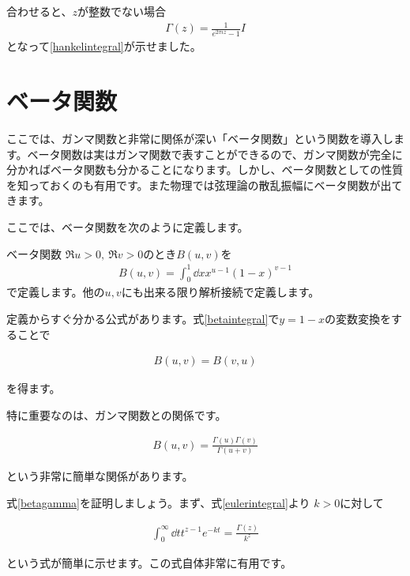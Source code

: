 \documentclass[report,paper=a4, fontsize=12pt, line_length=16cm, number_of_lines=33,dvipdfmx]{jlreq}
\newenvironment{important}{\begin{tcolorbox}[
  colback = white,
  colframe = red!35,
  boxrule = 2mm,
  fonttitle = \bfseries,
  after = \noindent] }{\end{tcolorbox}}
\numberwithin{equation}{section}
\begin{document}
合わせると、$z$が整数でない場合
\begin{align}
 \Gamma(z)=\frac{1}{e^{2\pi iz}-1} I
\end{align}
となって\eqref{hankelintegral}が示せました。


\section{ベータ関数}
ここでは、ガンマ関数と非常に関係が深い「ベータ関数」という関数を導入します。ベータ関数は実はガンマ関数で表すことができるので、ガンマ関数が完全に分かればベータ関数も分かることになります。しかし、ベータ関数としての性質を知っておくのも有用です。また物理では弦理論の散乱振幅にベータ関数が出てきます。

ここでは、ベータ関数を次のように定義します。
\begin{definition}{ベータ関数}{}
  $\Re u>0, \ \Re v >0$のとき$B(u,v)$を
  \begin{align}
    B(u,v)=\int_0^{1}\dd{x} x^{u-1}(1-x)^{v-1}\label{betaintegral}
  \end{align}
  で定義します。他の$u,v$にも出来る限り解析接続で定義します。
\end{definition}

定義からすぐ分かる公式があります。式\eqref{betaintegral}で$y=1-x$の変数変換をすることで
\begin{important}
  \begin{align}
    B(u,v)=B(v,u)
  \end{align}
\end{important}
を得ます。

特に重要なのは、ガンマ関数との関係です。
\begin{important}
  \begin{align}
    B(u,v)=\frac{\Gamma(u)\Gamma(v)}{\Gamma(u+v)}\label{betagamma}
  \end{align}
\end{important}
という非常に簡単な関係があります。

式\eqref{betagamma}を証明しましょう。まず、式\eqref{eulerintegral}より
$k>0$に対して
\begin{important}
  \begin{align}
    \int_{0}^{\infty}\dd{t}t^{z-1}e^{-kt}=\frac{\Gamma(z)}{k^z}
    \label{gammausefulformula}
  \end{align}    
\end{important}
という式が簡単に示せます。この式自体非常に有用です。
\end{document}
